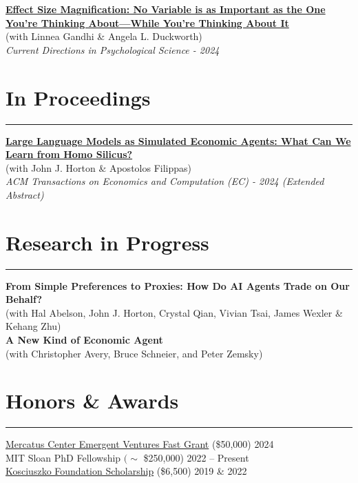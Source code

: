 \documentclass[11.25pt]{article}
\begin{document}
\noindent \textbf{\href{https://journals.sagepub.com/doi/full/10.1177/09637214241268222}{Effect Size Magnification: No Variable is as Important as the One You’re Thinking About—While You’re Thinking About It}} \\
(with Linnea Gandhi \& Angela L. Duckworth)\\
\textit{Current Directions in Psychological Science - 2024}

\newpage \clearpage

\section*{In Proceedings} \vspace{-1mm} \hrule
\vspace{3mm}
\href{https://dl.acm.org/doi/10.1145/3670865.3673513}{\textbf{Large Language Models as Simulated Economic Agents: What Can We Learn from Homo Silicus?}} \\ (with John J. Horton \& Apostolos Filippas) \\ \textit{ACM Transactions on Economics and Computation (EC) - 2024 (Extended Abstract)}

\section*{Research in Progress} \vspace{-1mm} \hrule
\vspace{3mm}

\noindent\textbf{From Simple Preferences to Proxies: How Do AI Agents Trade on Our Behalf?}\\ 
(with Hal Abelson, John J. Horton, Crystal Qian, Vivian Tsai, James Wexler \& Kehang Zhu)\\

\noindent\textbf{A New Kind of Economic Agent}\\ 
(with Christopher Avery, Bruce Schneier, and Peter Zemsky)\\

\section*{Honors \& Awards} \hrule
\vspace{3mm}
\href{https://www.mercatus.org/emergent-ventures}{Mercatus Center Emergent Ventures Fast Grant} (\$50,000) \hfill 2024\\
MIT Sloan PhD Fellowship $(\sim$ \$250,000) \hfill 2022 -- Present\\
\href{https://thekf.org/scholarship/tuition-scholarships/}{Kosciuszko Foundation Scholarship} (\$6,500) \hfill 2019 \& 2022\\
\end{document}
